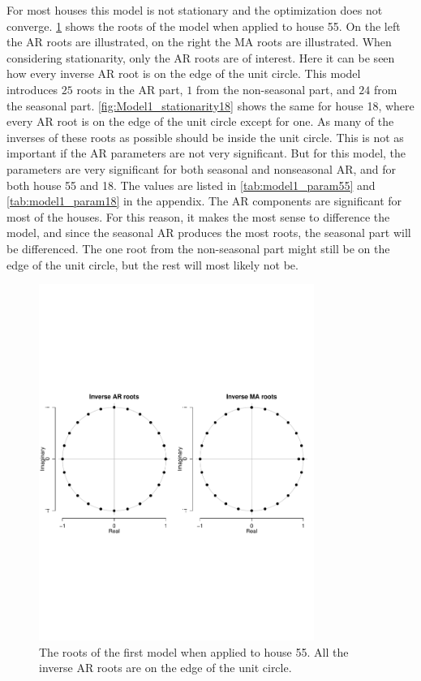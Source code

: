 \noindent For most houses this model is not stationary and the optimization does not converge. \cref{fig:Model1_stationarity} shows the roots of the model when applied to house 55. On the left the AR roots are illustrated, on the right the MA roots are illustrated. When considering stationarity, only the AR roots are of interest. Here it can be seen how every inverse AR root is on the edge of the unit circle. This model introduces $25$ roots in the AR part, $1$ from the non-seasonal part, and $24$ from the seasonal part. \cref{fig:Model1_stationarity18} shows the same for house 18, where every AR root is on the edge of the unit circle except for one. As many of the inverses of these roots as possible should be inside the unit circle. This is not as important if the AR parameters are not very significant. But for this model, the parameters are very significant for both seasonal and nonseasonal AR, and for both house 55 and 18. The values are listed in \cref{tab:model1_param55} and \cref{tab:model1_param18} in the appendix. The AR components are significant for most of the houses. For this reason, it makes the most sense to difference the model, and since the seasonal AR produces the most roots, the seasonal part will be differenced. The one root from the non-seasonal part might still be on the edge of the unit circle, but the rest will most likely not be.
\begin{figure}
    \centering
    \includegraphics[width=0.8\textwidth]{../../../figures/arimax/Stationarity_model1.pdf}
    \caption{The roots of the first model when applied to house 55. All the inverse AR roots are on the edge of the unit circle.}
    \label{fig:Model1_stationarity}
\end{figure}
